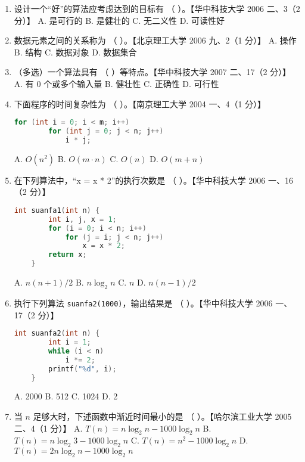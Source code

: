 \documentclass[lang=cn,newtx,10pt,scheme=chinese]{elegantbook}
\begin{document}
\begin{enumerate}
    \item 设计一个“好”的算法应考虑达到的目标有 （ \quad）。【华中科技大学 2006 二、3（2 分）】  
    A. 是可行的 \quad B. 是健壮的 \quad C. 无二义性 \quad D. 可读性好  

    \item 数据元素之间的关系称为 （ \quad）。【北京理工大学 2006 九、2（1 分）】  
    A. 操作 \quad B. 结构 \quad C. 数据对象 \quad D. 数据集合  

    \item （多选）一个算法具有 （ \quad）等特点。【华中科技大学 2007 二、17（2 分）】  
    A. 有 0 个或多个输入量 \quad B. 健壮性 \quad C. 正确性 \quad D. 可行性  

    \item 下面程序的时间复杂性为 （ \quad）。【南京理工大学 2004 一、4（1 分）】  
    \begin{lstlisting}[language=C]
    for (int i = 0; i < m; i++)
        for (int j = 0; j < n; j++)
            i * j;
    \end{lstlisting}
    A. $O(n^2)$ \quad B. $O(m \cdot n)$ \quad C. $O(n)$ \quad D. $O(m + n)$

    \item 在下列算法中，“x = x * 2”的执行次数是 （ \quad）。【华中科技大学 2006 一、16（2 分）】  
    \begin{lstlisting}[language=C]
    int suanfa1(int n) {
        int i, j, x = 1;
        for (i = 0; i < n; i++)
            for (j = i; j < n; j++)
                x = x * 2;
        return x;
    }
    \end{lstlisting}
    A. $n(n + 1)/2$ \quad B. $n \log_2 n$ \quad C. $n$ \quad D. $n(n - 1)/2$

    \item 执行下列算法 \texttt{suanfa2(1000)}，输出结果是 （ \quad）。【华中科技大学 2006 一、17（2 分）】  
    \begin{lstlisting}[language=C]
    int suanfa2(int n) {
        int i = 1;
        while (i < n)
            i *= 2;
        printf("%d", i);
    }
    \end{lstlisting}
    A. 2000 \quad B. 512 \quad C. 1024 \quad D. 2

    \item 当 $n$ 足够大时，下述函数中渐近时间最小的是 （ \quad）。【哈尔滨工业大学 2005 二、4（1 分）】  
    A. $T(n) = n \log_2 n - 1000 \log_2 n$  
    B. $T(n) = n \log_2 3 - 1000 \log_2 n$  
    C. $T(n) = n^2 - 1000 \log_2 n$  
    D. $T(n) = 2n \log_2 n - 1000 \log_2 n$


\end{enumerate}
\end{document}
